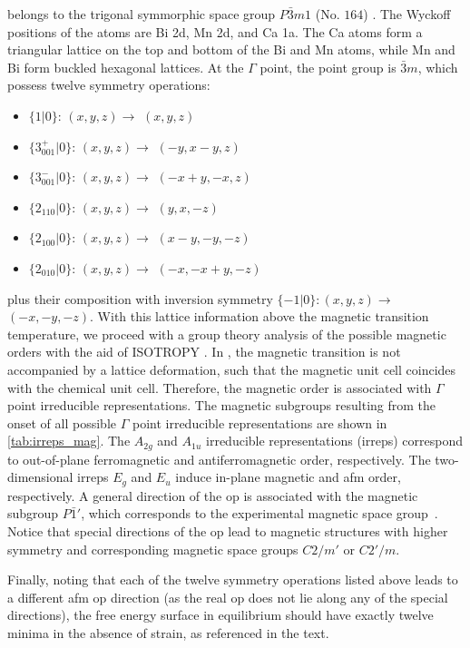 \cmb belongs to the trigonal symmorphic space group $P\bar 3m1$ (No. $164$) \citep{gibson_magnetic_2015}.
The Wyckoff positions of the atoms are Bi 2d, Mn 2d, and Ca 1a.
The Ca atoms form a triangular lattice on the top and bottom of the Bi and Mn atoms, while Mn and Bi form  buckled hexagonal lattices.
At the $\Gamma$ point, the point group is $\bar{3}m$, which possess twelve symmetry operations: 
%
\begin{itemize}
\item[] $\{ 1 | 0 \}$: $(x,y,z) \rightarrow$ $(x,y,z)$
\item[]  $\{ 3^+_{001} | 0 \}$: $(x,y,z) \rightarrow$ $(-y,x-y,z)$
\item[]  $\{  3^-_{001} | 0 \}$: $(x,y,z) \rightarrow$ $(-x+y,-x,z)$
\item[]  $\{ 2_{110} | 0 \}$: $(x,y,z) \rightarrow$ $(y,x,-z)$
\item[]  $\{ 2_{100} | 0 \}$: $(x,y,z) \rightarrow$ $(x-y,-y,-z)$
\item[]  $\{ 2_{010} | 0 \}$: $(x,y,z) \rightarrow$ $(-x,-x+y,-z)$
\end{itemize}
%
plus their composition with inversion symmetry $\{  -1| 0 \} : (x,y,z) \rightarrow$ $(-x,-y,-z)$.
With this lattice information above the magnetic transition temperature, we proceed with a group theory analysis of the possible magnetic orders with the aid of \small{ISOTROPY} \citep{ISOTROPY}.
In \cmb, the magnetic transition is not accompanied by a lattice deformation, such that the magnetic unit cell coincides with the chemical unit cell.
Therefore, the magnetic order is associated with $\Gamma$ point irreducible representations.
The magnetic subgroups resulting from the onset of all possible $\Gamma$ point irreducible representations are shown in \cref{tab:irreps_mag}.
The $A_{2g}$ and $A_{1u}$ irreducible representations (irreps) correspond to out-of-plane ferromagnetic and antiferromagnetic order, respectively.
The two-dimensional irreps $E_{g}$ and $E_{u}$ induce in-plane magnetic and \gls{afm} order, respectively.
A general direction of the \gls{op} is associated with the magnetic subgroup $P\bar 1'$, which corresponds to the experimental magnetic space group~\citep{gibson_magnetic_2015}.
Notice that special directions of the \gls{op} lead to magnetic structures with higher symmetry and corresponding magnetic space groups $C2/m'$ or $C2'/m$.

Finally, noting that each of the twelve symmetry operations listed above leads to a different \gls{afm} \gls{op} direction (as the real \gls{op} does not lie along any of the special directions), the free energy surface in equilibrium should have exactly twelve minima in the absence of strain, as referenced in the text.

